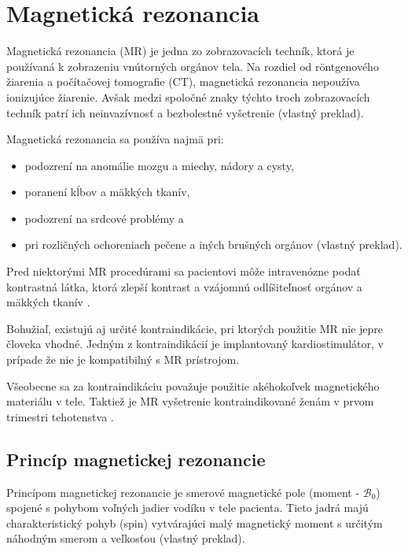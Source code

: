 \chapter {Magnetická rezonancia}
Magnetická rezonancia (MR) je jedna zo zobrazovacích techník, ktorá je používaná k zobrazeniu vnútorných orgánov tela.
Na rozdiel od röntgenového žiarenia a počítačovej tomografie (CT), magnetická rezonancia nepoužíva ionizujúce žiarenie. Avšak medzi spoločné znaky týchto troch zobrazovacích techník patrí ich neinvazívnosť a bezbolestné vyšetrenie \cite{basic_principles_of_mri} (vlastný preklad).

Magnetická rezonancia sa používa najmä pri:
\begin {itemize}
\item {podozrení na anomálie mozgu a miechy, nádory a cysty,}
\item {poranení kĺbov a mäkkých tkanív,}
\item {podozrení na srdcové problémy a}
\item {pri rozličných ochoreniach pečene a iných brušných orgánov \cite{mr_usage} (vlastný preklad).}
\end {itemize}

Pred niektorými MR procedúrami sa pacientovi môže intravenózne podať kontrastná látka, ktorá zlepší kontrast a vzájomnú odlíšiteľnosť orgánov \newline a mäkkých tkanív \cite{contrast_agents}.

Bohužiaľ, existujú aj určité kontraindikácie, pri ktorých použitie MR nie je\newline pre človeka vhodné.
Jedným z kontraindikácií je implantovaný kardiostimulátor, v prípade že nie je kompatibilný s MR prístrojom.
\clearpage

Všeobecne sa za kontraindikáciu považuje použitie akéhokoľvek magnetického materiálu v tele. Taktiež je MR vyšetrenie kontraindikované ženám v prvom trimestri tehotenstva \cite{mr_contraindications}.

\section {Princíp magnetickej rezonancie}
Princípom magnetickej rezonancie je smerové magnetické pole (moment - $\mathcal{B}_{0}$) spojené s pohybom voľných jadier vodíku v tele pacienta. Tieto jadrá majú charakteristický pohyb (spin) vytvárajúci malý magnetický moment s určitým náhodným smerom a veľkosťou  \cite{basic_principles_of_mri} (vlastný preklad).


